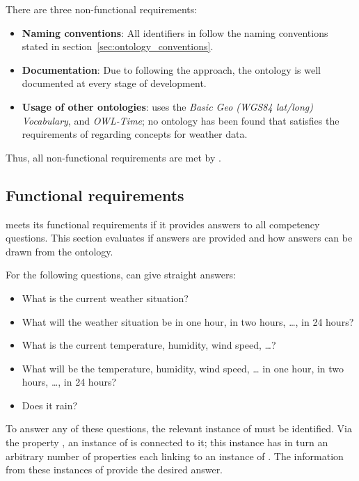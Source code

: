 There are three non-functional requirements:

\begin{itemize}
  \item \textbf{Naming conventions}: All identifiers in \thinkhomeweather follow the naming conventions stated in section~\ref{sec:ontology_conventions}.
  \item \textbf{Documentation}: Due to following the \methontology approach, the ontology is well documented at every stage of development.
  \item \textbf{Usage of other ontologies}: \thinkhomeweather uses the \emph{Basic Geo (WGS84 lat/long) Vocabulary}, \muo and \emph{OWL-Time}; no ontology has been found that satisfies the requirements of \thinkhomeweather regarding concepts for weather data.
\end{itemize}

Thus, all non-functional requirements are met by \thinkhomeweather.

\subsection{Functional requirements}
\label{sec:evaluation_functional}

\thinkhomeweather meets its functional requirements if it provides answers to all competency questions. This section evaluates if answers are provided and how answers can be drawn from the ontology.

For the following questions, \thinkhomeweather can give straight answers:
\begin{itemize}
  \item What is the current weather situation?
  \item What will the weather situation be in one hour, in two hours, …, in 24 hours?
  \item What is the current temperature, humidity, wind speed, …?
  \item What will be the temperature, humidity, wind speed, … in one hour, in two hours, …, in 24 hours?
  \item Does it rain?
\end{itemize}
To answer any of these questions, the relevant instance of  must be identified. Via the property , an instance of  is connected to it; this instance has in turn an arbitrary number of  properties each linking to an instance of . The information from these instances of  provide the desired answer.

